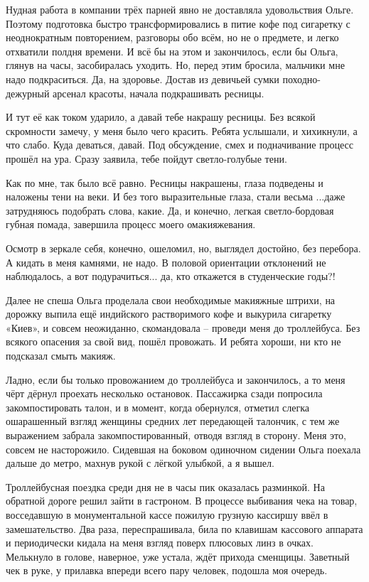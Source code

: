 Нудная работа в компании трёх парней явно не доставляла
удовольствия Ольге. Поэтому  подготовка быстро трансформировались в
питие кофе под сигаретку с неоднократным повторением, разговоры обо всём,
но не о предмете,  и легко отхватили полдня времени.  И всё бы на этом и
закончилось, если бы Ольга, глянув на часы, засобиралась уходить. Но,
перед этим бросила, мальчики мне надо подкраситься. Да, на здоровье.
Достав из девичьей сумки походно-дежурный арсенал красоты, начала
подкрашивать ресницы. 

И тут её как током ударило, а давай тебе накрашу ресницы. Без всякой скромности
замечу, у меня было чего красить. Ребята услышали, и хихикнули, а что слабо.
Куда  деваться, давай. Под обсуждение, смех и подначивание процесс  прошёл на
ура. Сразу заявила, тебе пойдут светло-голубые тени. 

Как по мне, так было всё равно. Ресницы накрашены, глаза подведены и наложены
тени на веки. И без того выразительные глаза, стали весьма ...даже затрудняюсь
подобрать слова, какие. Да, и конечно, легкая светло-бордовая губная помада,
завершила процесс моего омакияжевания. 

Осмотр в зеркале себя, конечно,  ошеломил, но, выглядел достойно, без перебора.
А кидать в меня камнями, не надо. В половой ориентации  отклонений не
наблюдалось, а вот подурачиться... да, кто откажется в студенческие годы?! 

Далее не спеша Ольга проделала свои  необходимые макияжные штрихи, на дорожку
выпила  ещё индийского растворимого кофе и выкурила сигаретку «Киев», и совсем
неожиданно, скомандовала – проведи меня до троллейбуса. Без всякого опасения за
свой вид,  пошёл провожать. И ребята хороши, ни кто не подсказал смыть макияж. 

Ладно, если бы только провожанием до троллейбуса и закончилось,  а то меня
чёрт дёрнул проехать несколько остановок. Пассажирка сзади попросила
закомпостировать талон, и в момент, когда обернулся, отметил слегка
ошарашенный взгляд женщины средних лет передающей талончик,  с тем же
выражением  забрала закомпостированный, отводя взгляд в сторону. Меня  это,
совсем не насторожило.  Сидевшая на боковом одиночном сидении  Ольга поехала
дальше до метро, махнув рукой с лёгкой улыбкой, а я вышел.   

Троллейбусная поездка среди дня не в часы пик оказалась  разминкой. На обратной
дороге решил зайти в гастроном.  В процессе выбивания чека на товар,
восседавшую в монументальной кассе пожилую  грузную кассиршу ввёл в
замешательство.   Два раза, переспрашивала, била по клавишам кассового аппарата
и периодически кидала на меня взгляд поверх плюсовых линз в очках.  Мелькнуло в
голове, наверное, уже устала, ждёт прихода сменщицы. Заветный чек в руке,  у
прилавка впереди всего пару человек,  подошла моя очередь.  

